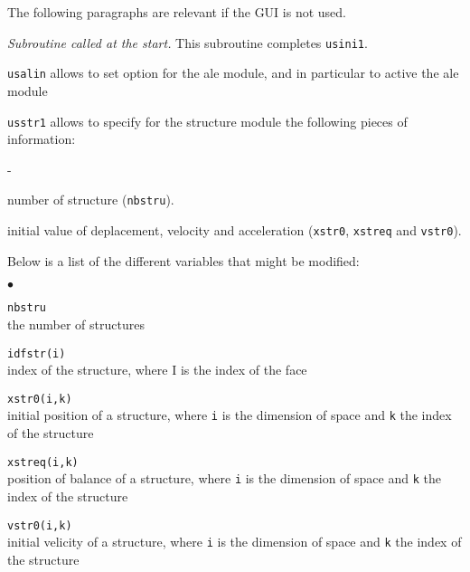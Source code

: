 {{{The following paragraphs are relevant if the GUI is not used.

\noindent
\textit{Subroutine called at the start.}
This subroutine completes \texttt{usini1}.

\texttt{usalin} allows to set option for the ale module, and in
particular to active the ale module


\texttt{usstr1} allows to specify for the structure module the
following pieces of information:
\begin{list}{-}{}
  \item number of structure (\texttt{nbstru}).
  \item initial value of deplacement, velocity and acceleration
    (\texttt{xstr0}, \texttt{xstreq} and \texttt{vstr0}).
\end{list}

Below is a list of the different variables that might be modified:

\begin{list}{$\bullet$}{}

\item{\texttt{nbstru}} \\
{the number of structures}

\item{\texttt{idfstr(i)}} \\
{index of the structure, where I is the index of the face}

\item{\texttt{xstr0(i,k)}} \\
{initial position of a structure, where \texttt{i} is the dimension of space
and \texttt{k} the index of the structure}

\item{\texttt{xstreq(i,k)}} \\
{position of balance of a structure, where \texttt{i} is the dimension of space
and \texttt{k} the index of the structure}

\item{\texttt{vstr0(i,k)}} \\
{initial velicity of a structure, where \texttt{i} is the dimension of space
and \texttt{k} the index of the structure }
\end{list}

}}}

